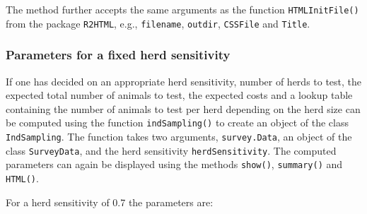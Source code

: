 \documentclass[nojss]{jss}
\begin{document}
The method further accepts the same arguments as the function
\texttt{HTMLInitFile()} from the package \texttt{R2HTML}, e.g., 
\texttt{filename}, \texttt{outdir}, \texttt{CSSFile} and 
\texttt{Title}.


\subsubsection{Parameters for a fixed herd sensitivity}

If one has decided on an appropriate herd sensitivity, number of 
herds to test, the expected total number of animals to test, the 
expected costs and a lookup table containing the number of animals 
to test per herd depending on the herd size can be computed using 
the function \texttt{indSampling()}  
to create an object of the class \texttt{IndSampling}. 
  The 
function takes two arguments, \texttt{survey.Data}, an object of the 
class \texttt{SurveyData}, and the herd sensitivity 
\texttt{herdSensitivity}. The computed parameters can again be 
displayed using the methods \texttt{show()}, \texttt{summary()} and 
\texttt{HTML()}.  

For a herd sensitivity of 0.7 the parameters are:
  
\end{document}
